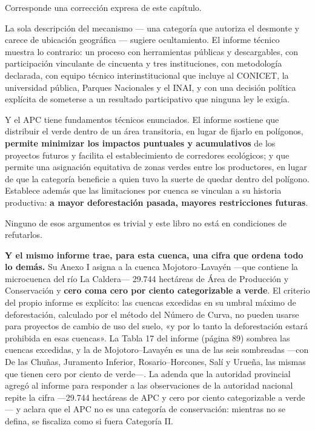 \begin{cautela}
Corresponde una corrección expresa de este capítulo.

La sola descripción del mecanismo --- una categoría que autoriza el desmonte y carece de ubicación geográfica --- sugiere ocultamiento. El informe técnico muestra lo contrario: un proceso con herramientas públicas y descargables, con participación vinculante de cincuenta y tres instituciones, con metodología declarada, con equipo técnico interinstitucional que incluye al CONICET, la universidad pública, Parques Nacionales y el INAI, y con una decisión política explícita de someterse a un resultado participativo que ninguna ley le exigía.

Y el APC tiene fundamentos técnicos enunciados. El informe sostiene que distribuir el verde dentro de un área transitoria, en lugar de fijarlo en polígonos, \textbf{permite minimizar los impactos puntuales y acumulativos} de los proyectos futuros y facilita el establecimiento de corredores ecológicos; y que permite una asignación equitativa de zonas verdes entre los productores, en lugar de que la categoría beneficie a quien tuvo la suerte de quedar dentro del polígono. Establece además que las limitaciones por cuenca se vinculan a su historia productiva: \textbf{a mayor deforestación pasada, mayores restricciones futuras}.

Ninguno de esos argumentos es trivial y este libro no está en condiciones de refutarlos.
\end{cautela}

\textbf{Y el mismo informe trae, para esta cuenca, una cifra que ordena todo lo demás.} Su Anexo I asigna a la cuenca Mojotoro--Lavayén ---que contiene la microcuenca del río La Caldera--- 29.744 hectáreas de Área de Producción y Conservación y \textbf{cero coma cero por ciento categorizable a verde}. El criterio del propio informe es explícito: las cuencas excedidas en su umbral máximo de deforestación, calculado por el método del Número de Curva, no pueden usarse para proyectos de cambio de uso del suelo, «y por lo tanto la deforestación estará prohibida en esas cuencas». La Tabla 17 del informe (página 89) sombrea las cuencas excedidas, y la de Mojotoro--Lavayén es una de las seis sombreadas ---con De las Chuñas, Juramento Inferior, Rosario--Horcones, Salí y Urueña, las mismas que tienen cero por ciento de verde---. La adenda que la autoridad provincial agregó al informe para responder a las observaciones de la autoridad nacional repite la cifra ---29.744 hectáreas de APC y cero por ciento categorizable a verde--- y aclara que el APC no es una categoría de conservación: mientras no se defina, se fiscaliza como si fuera Categoría II.

